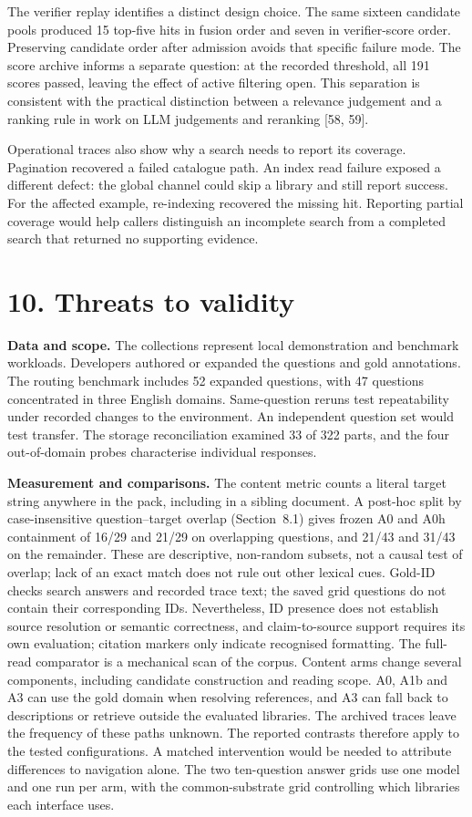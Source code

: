 The verifier replay identifies a distinct design choice. The same sixteen
candidate pools produced 15 top-five hits in fusion order and seven in
verifier-score order. Preserving candidate order after admission avoids
that specific failure mode. The score archive informs a separate question:
at the recorded threshold, all 191 scores passed, leaving the effect of
active filtering open. This separation is consistent with the practical
distinction between a relevance judgement and a ranking rule in work on
LLM judgements and reranking [58, 59].

Operational traces also show why a search needs to report its coverage.
Pagination recovered a failed catalogue path. An index read failure exposed
a different defect: the global channel could skip a library and still report
success. For the affected example, re-indexing recovered the missing hit.
Reporting partial coverage would help callers distinguish an incomplete search
from a completed search that returned no supporting evidence.


\section{10. Threats to validity}


\noindent\textbf{Data and scope.} The collections represent local
demonstration and benchmark workloads. Developers authored or expanded the
questions and gold annotations. The routing benchmark includes 52 expanded
questions, with 47 questions concentrated in three English domains.
Same-question reruns test repeatability under recorded changes to the
environment. An independent question set would test transfer. The storage
reconciliation examined 33 of 322 parts, and the four out-of-domain probes
characterise individual responses.

\noindent\textbf{Measurement and comparisons.} The content metric counts a
literal target string anywhere in the pack, including in a sibling
document. A post-hoc split by case-insensitive question--target overlap
(Section~8.1) gives frozen A0 and A0h containment of
16/29 and 21/29 on overlapping questions, and 21/43 and 31/43 on the
remainder. These are descriptive, non-random subsets, not a causal test of
overlap; lack of an exact match does not rule out other lexical cues.
Gold-ID checks search answers and recorded trace text; the saved grid
questions do not contain their corresponding IDs. Nevertheless, ID presence
does not establish source resolution or semantic correctness, and
claim-to-source support requires its own evaluation; citation markers only
indicate recognised formatting. The full-read comparator is a mechanical
scan of the corpus. Content arms change several components, including candidate
construction and reading scope. A0, A1b and A3 can use the gold domain when
resolving references, and A3 can fall back to descriptions or retrieve
outside the evaluated libraries. The archived traces leave the frequency of
these paths unknown. The reported contrasts therefore apply to the tested
configurations. A matched intervention would be needed to attribute
differences to navigation alone. The two ten-question answer grids use one
model and one run per arm, with the common-substrate grid controlling which
libraries each interface uses.

